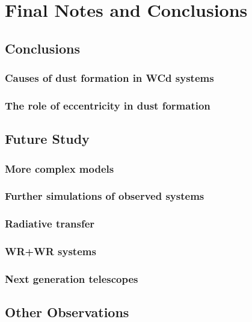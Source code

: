 \chapter{Final Notes and Conclusions}

\section{Conclusions}

\subsection{Causes of dust formation in WCd systems}

\subsection{The role of eccentricity in dust formation}

\section{Future Study}

\subsection{More complex models}

\subsection{Further simulations of observed systems}

\subsection{Radiative transfer}

\subsection{WR+WR systems}

\subsection{Next generation telescopes}

\section{Other Observations}

